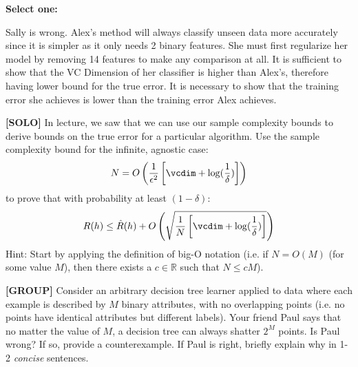 \documentclass[11pt,addpoints,answers]{exam}
\newcommand{\solo}{\textbf{[SOLO]} }
\newcommand{\group}{\textbf{[GROUP]} }
\begin{document}
\begin{questions}
\begin{parts}
    \textbf{Select one:}
    \begin{checkboxes}
        \choice Sally is wrong. Alex's method will always classify unseen data more accurately since it is simpler as it only needs 2 binary features.
        \choice She must first regularize her model by removing 14 features to make any comparison at all.
        \choice It is sufficient to show that the VC Dimension of her classifier is higher than Alex's, therefore having lower bound for the true error.
        \choice It is necessary to show that the training error she achieves is lower than the training error Alex achieves.
    \end{checkboxes}
    
\end{parts}

\question[4] \solo In lecture, we saw that we can use our sample complexity bounds to derive bounds on the true error for a particular algorithm. Use the sample complexity bound for the infinite, agnostic case:
$$N = O\left(\frac{1}{\epsilon^2} \left[\vcdim + \log(\frac{1}{\delta}) \right] \right)$$
to prove that with probability at least $(1-\delta)$: $$R(h) \le \hat{R}(h) + O\left(\sqrt{\frac{1}{N} \left[\vcdim + \log(\frac{1}{\delta}) \right]} \right)$$
    Hint: Start by applying the definition of big-O notation (i.e. if $N = O(M)$ (for some value $M$), then there exists a $c \in \mathbb{R}$ such that $N \le cM$).
    
    \begin{your_solution}[height=12cm, width=14cm]
    \end{your_solution}
    
    
    
\question[3] \group Consider an arbitrary decision tree learner applied to data where each example is described by $M$ binary attributes, with no overlapping points (i.e. no points have identical attributes but different labels). Your friend Paul says that no matter the value of $M$, a decision tree can always shatter $2^M$ points. Is Paul wrong? If so, provide a counterexample. If Paul is right, briefly explain why in 1-2 \emph{concise} sentences.
    
    \begin{your_solution}[fit,height=4cm, width=14cm]
    
    \end{your_solution}   
    
    
    

\end{questions}
\end{document}
